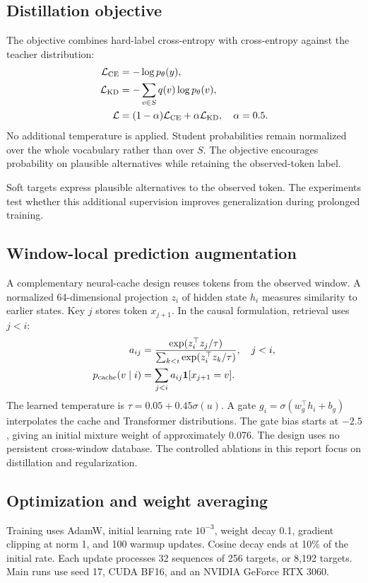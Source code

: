 \documentclass[10pt,twocolumn,letterpaper]{article}
\begin{document}
\subsection{Distillation objective}
The objective combines hard-label cross-entropy with cross-entropy against the
teacher distribution:
\begin{align}
\mathcal L_{\rm CE}&=-\log p_\theta(y),\\
\mathcal L_{\rm KD}&=-\sum_{v\in S}q(v)\log p_\theta(v),\\
\mathcal L&=(1-\alpha)\mathcal L_{\rm CE}+\alpha\mathcal L_{\rm KD},
\quad\alpha=0.5.\label{eq:loss}
\end{align}
No additional temperature is applied. Student probabilities remain normalized
over the whole vocabulary rather than over $S$. The objective encourages
probability on plausible alternatives while retaining the observed-token label.

Soft targets express plausible alternatives to the observed token.
The experiments test whether this additional supervision improves
generalization during prolonged training.

\subsection{Window-local prediction augmentation}
A complementary neural-cache design reuses tokens from the observed window.
A normalized 64-dimensional projection $z_i$ of hidden state $h_i$ measures
similarity to earlier states. Key $j$ stores token $x_{j+1}$. In the causal
formulation, retrieval uses $j<i$:
\begin{align}
a_{ij}&=\frac{\exp(z_i^\top z_j/\tau)}{\sum_{k<i}\exp(z_i^\top z_k/\tau)},\quad j<i,\\
p_{\rm cache}(v\mid i)&=\sum_{j<i}a_{ij}\mathbf{1}[x_{j+1}=v].
\end{align}
The learned temperature is $\tau=0.05+0.45\sigma(u)$. A gate
$g_i=\sigma(w_g^\top h_i+b_g)$ interpolates the cache and Transformer
distributions. The gate bias starts at $-2.5$, giving an initial mixture weight
of approximately 0.076. The design uses no persistent cross-window database.
The controlled ablations in this report focus on distillation and regularization.

\subsection{Optimization and weight averaging}
Training uses AdamW, initial learning rate $10^{-3}$, weight decay 0.1, gradient
clipping at norm 1, and 100 warmup updates. Cosine decay ends at 10\% of the
initial rate. Each update processes 32 sequences of 256 targets, or 8,192
targets. Main runs use seed 17, CUDA BF16, and an NVIDIA GeForce RTX 3060.
\end{document}
